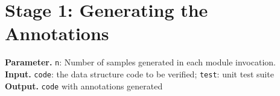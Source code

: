 


\section{Stage 1: Generating the Annotations}
\label{sec:genfunc}
\begin{small}
\begin{algorithm}[t]
\small
\SetAlgoNoLine 
{}
\caption{The Generation Stage}
\label{fig:genfunc}
\textbf{Parameter.} {\texttt{n}: Number of samples generated in each module invocation.}\\
\textbf{Input.} {\texttt{code}: the data structure code to be verified; \texttt{test}: unit test suite}\\
\textbf{Output.} {\texttt{code} with annotations generated}\\
\end{algorithm}
\end{small}


